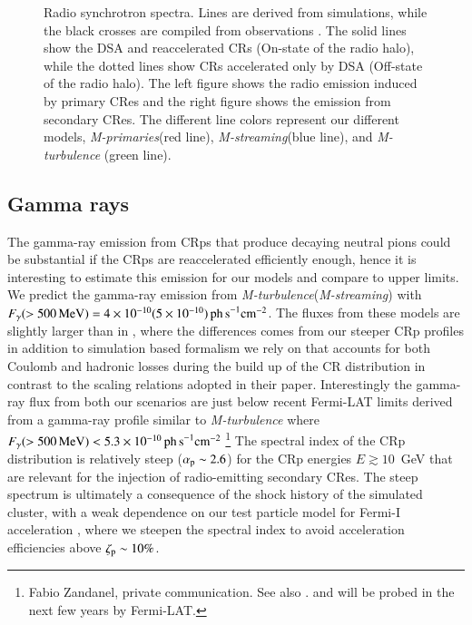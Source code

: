 \documentclass[fleqn,usenatbib,useAMS]{mnras}
\newcommand{\Mstream}{{\it M-streaming}\xspace}
\newcommand{\Mflatturb}{{\it M-turbulence}\xspace}
\newcommand{\Mprimary}{{\it M-primaries}\xspace}
\begin{document}
\begin{figure}
  \caption{Radio synchrotron spectra. Lines are derived from
    simulations, while the black crosses are compiled from
    observations \citet{2010PhDT.......259P}. The solid lines show the
    DSA and reaccelerated CRs (On-state of the radio halo), while the
    dotted lines show CRs accelerated only by DSA (Off-state of the
    radio halo). The left figure shows the radio emission induced by
    primary CRes and the right figure shows the emission from
    secondary CRes. The different line colors represent our different
    models, \Mprimary (red line), \Mstream (blue line), and \Mflatturb
    (green line).}
  \label{fig:sync_spectrum}
\end{figure}

\subsection{Gamma rays}
The gamma-ray emission from CRps that produce decaying neutral pions
could be substantial if the CRps are reaccelerated efficiently enough,
hence it is interesting to estimate this emission for our models and
compare to upper limits. We predict the gamma-ray emission from
\Mflatturb (\Mstream) with $F_\gamma(>500\,{\mathrm{MeV}})=4\times10^{-10}
(5\times10^{-10}) \mathrm{ \,ph\, s}^{-1}\mathrm{cm}^{-2}$. The fluxes
from these models are slightly larger than in \cite{brunetti12}, where
the differences comes from our steeper CRp profiles in addition to
simulation based formalism we rely on that accounts for both Coulomb
and hadronic losses during the build up of the CR distribution in
contrast to the scaling relations adopted in their
paper. Interestingly the gamma-ray flux from both our scenarios are
just below recent Fermi-LAT limits derived from a gamma-ray profile
similar to \Mflatturb where
$F_\gamma(>500\,{\mathrm{MeV}})<5.3\times10^{-10} \mathrm{ \,ph\,
  s}^{-1}\mathrm{cm}^{-2}$ \footnote{Fabio Zandanel, private
  communication. See also
  \citet{2014MNRAS.440..663Z,2014ApJ...787...18A}. and will be probed
  in the next few years by Fermi-LAT. } The spectral index of the CRp
distribution is relatively steep ($\alpha_{{\mathrm{p}}}\sim2.6$) for the
CRp energies $E \gtrsim 10$~GeV that are relevant for the injection of
radio-emitting secondary CRes. The steep spectrum is ultimately a
consequence of the shock history of the simulated cluster, with a weak
dependence on our test particle model for Fermi-I acceleration
\citep{pinzke13}, where we steepen the spectral index to avoid
acceleration efficiencies above $\zeta_{{\mathrm{p}}} \sim 10\%$.
\end{document}
